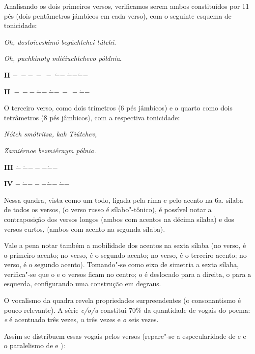 Analisando os dois primeiros versos, verificamos serem ambos
constituídos por 11 pés (dois pentâmetros jámbicos em cada verso), com o
seguinte esquema de tonicidade:

\emph{Oh, dostoievskimó begúchtchei tútchi.}

\emph{Oh, puchkinoty mliéiuchtchevo póldnia}.

\textbf{II}
\(\mathbf{- \  - - \  - \  - \ }\acute{\mathbf{-}}\mathbf{- \ }\acute{\mathbf{-}}\mathbf{-}\acute{\mathbf{-}}\mathbf{-}\)

\textbf{II~}\(\mathbf{- \  - - \ }\acute{\mathbf{-}}\mathbf{- \ }\acute{\mathbf{-}}\mathbf{- \  - \  -}\acute{\mathbf{-}}\mathbf{-}\)

O terceiro verso, como dois trímetros (6 pés jâmbicos) e o quarto como
dois tetrâmetros (8 pés jâmbicos), com a respectiva tonicidade:

\emph{Nótch smótritsa, kak Tiútchev,}

\emph{Zamiérnoe bezmiérnym pólnia.}

\textbf{III}
\(\acute{\mathbf{-}}\mathbf{\ }\acute{\mathbf{-}}\mathbf{- - -}\acute{\mathbf{-}}\mathbf{- \ }\)

\textbf{IV}
\(\mathbf{- \ }\acute{\mathbf{-}}\mathbf{- - -}\acute{\mathbf{-}}\mathbf{- \ }\acute{\mathbf{-}}\mathbf{- \ }\)\textbf{\\
}

Nessa quadra, vista como um todo, ligada pela rima  e pelo acento na
6a. sílaba de todos os versos, (o verso russo é sílabo"-tônico), é
possível notar a contraposição dos versos longos (ambos com acentos na
décima sílaba) e dos versos curtos, (ambos com acento na segunda
sílaba).

Vale a pena notar também a mobilidade dos acentos na sexta sílaba (no 
verso, é o primeiro acento; no  verso, é o segundo acento; no 
verso, é o terceiro acento; no  verso, é o segundo acento). Tomando"-se
como eixo de simetria a sexta sílaba, verifica"-se que o  e o  versos
ficam no centro; o  é deslocado para a direita, o  para a esquerda,
configurando uma construção em degraus.

O vocalismo da quadra revela propriedades surpreendentes (o
consonantismo é pouco relevante). A série \emph{e/o/u} constitui 70\% da
quantidade de vogais do poema: \emph{e} é acentuado três vezes, \emph{u}
três vezes e \emph{o} seis vezes.

Assim se distribuem essas vogais pelos versos (repare"-se a
especularidade de  e  e o paralelismo de  e ):


